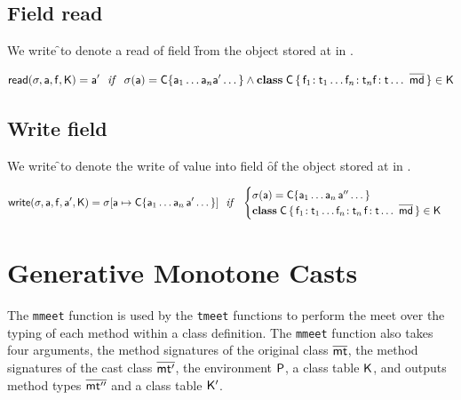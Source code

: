 \documentclass[a4paper,USenglish]{tex/lipics-v2016}
\begin{document}
\begin{mathpar}




\end{mathpar}


\subsection{Field read}

We write \readf\s\a\f\K to denote a read of field \f from the object
stored at \a in \s.

\begin{equation*}
\readf \s\a\f\K = \ap ~~\mathit{if}~~  \s(\a) = \obj\C{\a_1\dots\a_n \ap \dots} \AND
 \Class\C {\Fdef{\f_1}{\t_1}\dots\Fdef{\f_n}{\t_n}\Ftype\f\t\dots}{\b\md}\in\K
\end{equation*}

\subsection{Write field}

We write \setf\s\a\f\ap\K to denote the write of value \ap into field \f of
the object stored at \a in \s.

\begin{equation*}
\setf \s\a\f\ap\K= \Map\s{\Bind{\a}{\obj\C{\a_1\dots\a_n\,\ap\dots}}}
  ~~\mathit{if}~~ \begin{cases}
   \s(\a) = \obj\C{\a_1\dots\a_n\,\app\dots}\\
   \Class\C{\Fdef{\f_1}{\t_1}\dots\Fdef{\f_n}{\t_n}\,\Fdef\f\t\dots}{\b\md}\in\K
\end{cases}
\end{equation*}

\section{Generative Monotone Casts}

The \texttt{mmeet} function is used by the \texttt{tmeet} functions to
perform the meet over the typing of each method within a class definition.
The \texttt{mmeet} function also takes four arguments, the method
signatures of the original class $\b\mt$, the method signatures of the cast
class $\b\mtp$, the environment $\P$, a class table $\K$, and outputs method
types $\b\mtpp$ and a class table $\Kp$. 
\end{document}
